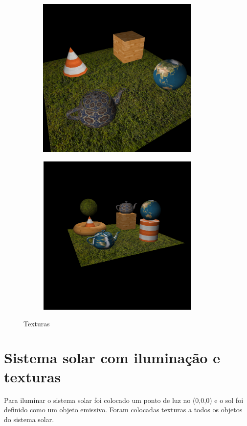 \documentclass[11pt,a4paper]{report}
\begin{document}
\vspace{1cm}
\begin{figure}[H]
\centering
\begin{subfigure}{0.5\textwidth}
  \centering
  \includegraphics[width = 8cm,height = 8cm]{test_4_7.png}
  \caption{\texttt{}}
  \label{fig:test_4_7}
\end{subfigure}%
\begin{subfigure}{0.5\textwidth}
  \centering
  \includegraphics[width = 8cm,height = 8cm]{test_tex.png}
  \caption{\texttt{}}
  \label{fig:test_tex}
\end{subfigure}
\label{fig:texturas}
\caption{Texturas}
\end{figure}

\newpage
\section{Sistema solar com iluminação e texturas}

Para iluminar o sistema solar foi colocado um ponto de luz no (0,0,0) e o sol foi definido como um objeto emissivo.
Foram colocadas texturas a todos os objetos do sistema solar.
\end{document}
